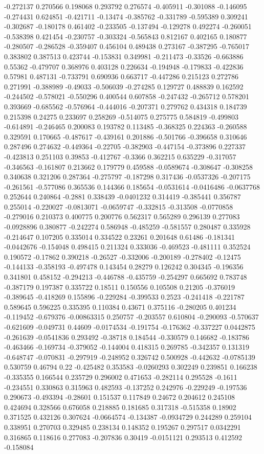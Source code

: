 -0.272137 0.270566 0.198068 0.293792 0.276574 -0.405911 -0.301088 -0.146095 -0.274431 0.624851 -0.421711 -0.13474 -0.385762 -0.331789 -0.595389 0.309241 -0.302687 -0.180178 0.461402 -0.233505 -0.137494 -0.129278 0.492274 -0.260051 -0.538398 0.421454 -0.230757 -0.303324 -0.565843 0.812167 0.402165 0.180877 -0.280507 -0.286528 -0.359407 0.456104 0.489438 0.273167 -0.387295 -0.765017 0.383802 0.387513 0.423744 -0.153831 0.349981 -0.211473 -0.33526 -0.663886 0.55362 -0.479707 0.368976 0.403128 0.226634 -0.194948 -0.179833 -0.422836 0.57981 0.487131 -0.733791 0.690936 0.663717 -0.447286 0.215123 0.272786 0.271991 -0.388989 -0.49033 -0.506039 -0.274285 0.129727 0.488839 0.162592 -0.244502 -0.578021 -0.550296 0.400544 0.607858 -0.247432 -0.265712 0.578201 0.393669 -0.685562 -0.576964 -0.444016 -0.207371 0.279762 0.434318 0.184739 0.215398 0.24275 0.233697 0.258269 -0.514075 0.275775 0.584819 -0.499803 -0.614891 -0.246465 0.200083 0.193782 0.113485 -0.368325 0.224363 -0.260588 0.329591 0.170665 -0.487617 -0.439161 0.201886 -0.501766 -0.396658 0.310646 0.287496 0.274632 -0.449364 -0.22705 -0.382903 -0.447154 -0.373896 0.227337 -0.423813 0.251103 0.39853 -0.412767 -0.3366 0.362215 0.635229 -0.317057 -0.346563 -0.161807 0.213662 0.179779 0.459588 -0.0589674 -0.308647 -0.308258 0.340638 0.321206 0.287364 -0.275797 -0.187298 0.317436 -0.0537326 -0.207175 -0.261561 -0.577086 0.365536 0.144366 0.185654 -0.0531614 -0.0416486 -0.0637768 0.252644 0.240864 -0.2881 0.338439 -0.0401232 0.314419 -0.385441 0.356787 0.255014 -0.220027 -0.0813071 -0.0659747 -0.332815 -0.313508 -0.0770858 -0.279016 0.210373 0.400775 0.200776 0.562317 0.565289 0.296139 0.277083 -0.0928896 0.380877 -0.242274 0.586948 -0.485259 -0.581557 0.280487 0.335928 -0.214647 0.107205 0.335014 0.334522 0.23261 0.201648 0.61486 -0.181341 -0.0442676 -0.154048 0.498415 0.211324 0.333036 -0.469523 -0.481111 0.352524 0.190572 -0.17862 0.390218 -0.26527 -0.332006 -0.200189 -0.278402 -0.12475 -0.144133 -0.358193 -0.497478 0.143454 0.28279 0.126242 0.304345 -0.196356 0.341801 0.458152 -0.294213 -0.446788 -0.435759 -0.254297 0.665692 0.783748 -0.387179 0.197387 0.335722 0.18511 0.150556 0.105508 0.21205 -0.376019 -0.389645 -0.418269 0.155896 -0.229284 -0.399533 0.2523 -0.241418 -0.221787 0.589645 0.596225 0.335395 0.110384 0.43671 0.375116 -0.280205 0.401234 -0.119452 -0.679376 -0.00863315 0.250757 -0.203557 0.610804 -0.290093 -0.570637 -0.621609 -0.049731 0.44609 -0.0174534 -0.191754 -0.176362 -0.337227 0.0442875 -0.261639 -0.0541836 0.293492 -0.38718 0.184544 -0.330579 0.146682 -0.183786 -0.463466 -0.169734 -0.379052 -0.144004 0.418315 0.269785 -0.342357 0.131319 -0.648747 -0.070831 -0.297919 -0.248952 0.326742 0.500928 -0.442632 -0.0785139 0.530759 0.46794 0.22 -0.425482 0.353583 -0.0260293 0.302249 0.239851 0.166238 -0.335355 0.166544 0.235729 0.296002 0.471653 -0.282114 0.295528 -0.1611 -0.234551 0.330863 0.315963 0.482593 -0.137252 0.242976 -0.229249 -0.197536 0.290673 -0.493394 -0.28601 0.151537 0.117849 0.24672 0.204612 0.245108 0.424694 0.328566 0.676058 0.218885 0.181685 0.317318 -0.515358 0.18902 0.371525 0.432126 0.307624 -0.0664574 -0.134387 -0.0934729 0.244289 0.259104 0.338951 0.270703 0.329485 0.238134 0.148352 0.195267 0.297517 0.0342291 0.316865 0.118616 0.277083 -0.207836 0.30419 -0.0151121 0.293513 0.412592 -0.158084 